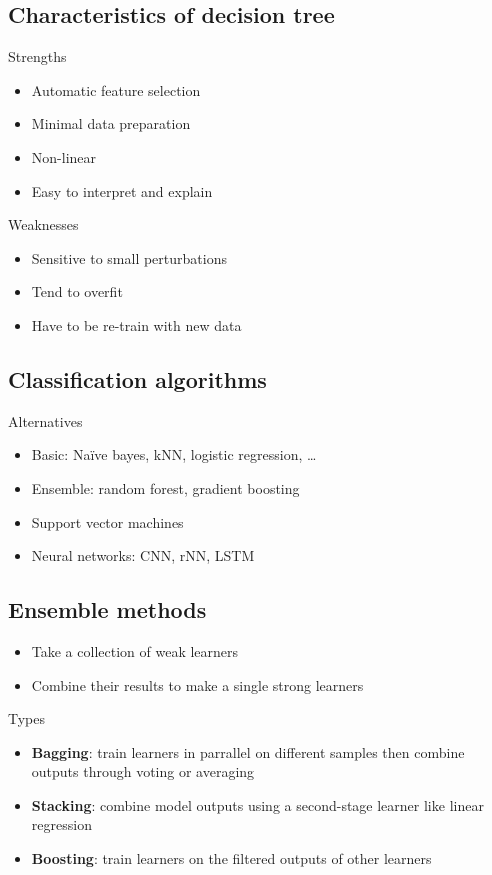 \subsection{Characteristics of decision tree}
Strengths
\begin{itemize}
\item Automatic feature selection
\item Minimal data preparation
\item Non-linear
\item Easy to interpret and explain
\end{itemize}
Weaknesses
\begin{itemize}
\item Sensitive to small perturbations
\item Tend to overfit
\item Have to be re-train with new data
\end{itemize}

\subsection{Classification algorithms}
Alternatives
\begin{itemize}
\item Basic: Naïve bayes, kNN, logistic regression, \ldots
\item Ensemble: random forest, gradient boosting
\item Support vector machines
\item Neural networks: CNN, rNN, LSTM
\end{itemize}

\subsection{Ensemble methods}
\begin{itemize}
\item Take a collection of weak learners
\item Combine their results to make a single strong learners
\end{itemize}

Types
\begin{itemize}
\item \textbf{Bagging}: train learners in parrallel on different
  samples then combine outputs through voting or averaging
\item \textbf{Stacking}: combine model outputs using a second-stage
  learner like linear regression
\item \textbf{Boosting}: train learners on the filtered outputs of
  other learners
\end{itemize}

